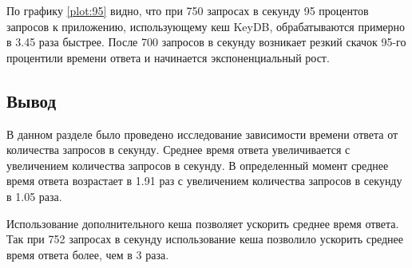 По графику \ref{plot:95} видно, что при 750 запросах в секунду 95 процентов запросов к приложению, использующему кеш KeyDB, обрабатываются примерно в 3.45 раза быстрее.
После 700 запросов в секунду возникает резкий скачок 95-го процентили времени ответа и начинается экспоненциальный рост.

\subsection*{Вывод}

В данном разделе было проведено исследование зависимости времени ответа от количества запросов в секунду.
Среднее время ответа увеличивается с увеличением количества запросов в секунду.
В определенный момент среднее время ответа возрастает в 1.91 раз с увеличением количества запросов в секунду в 1.05 раза.

Использование дополнительного кеша позволяет ускорить среднее время ответа.
Так при 752 запросах в секунду использование кеша позволило ускорить среднее время ответа более, чем в 3 раза.
